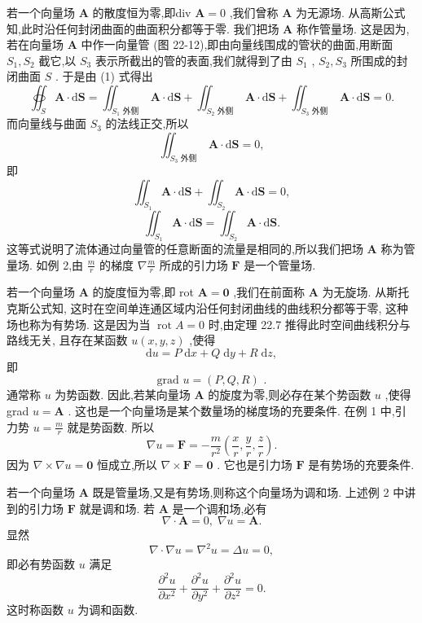 若一个向量场 \(\mathbf{A}\) 的散度恒为零,即div \(\mathbf{A} = 0\) ,我们曾称 \(\mathbf{A}\) 为无源场. 从高斯公式知,此时沿任何封闭曲面的曲面积分都等于零. 我们把场 \(\mathbf{A}\) 称作管量场. 这是因为,若在向量场 \(\mathbf{A}\) 中作一向量管 (图 22-12),即由向量线围成的管状的曲面,用断面 \({S}_{1},{S}_{2}\) 截它,以 \({S}_{3}\) 表示所截出的管的表面,我们就得到了由 \({S}_{1}\) , \({S}_{2},{S}_{3}\) 所围成的封闭曲面 \(S\) . 于是由 (1) 式得出
\[
{\oiint }_{S}\mathbf{A} \cdot  \mathrm{d}\mathbf{S} = {\iint }_{{S}_{1}\text{ 外侧 }}\mathbf{A} \cdot  \mathrm{d}\mathbf{S} + {\iint }_{{S}_{2}\text{ 外侧 }}\mathbf{A} \cdot  \mathrm{d}\mathbf{S} + {\iint }_{{S}_{3}\text{ 外侧 }}\mathbf{A} \cdot  \mathrm{d}\mathbf{S} = 0.
\]
而向量线与曲面 \({S}_{3}\) 的法线正交,所以
\[
{\iint }_{{S}_{3}\text{ 外侧 }}\mathbf{A} \cdot  \mathrm{d}\mathbf{S} = 0,
\]
即
\[
{\iint }_{{S}_{1}}\mathbf{A} \cdot  \mathrm{d}\mathbf{S} + {\iint }_{{S}_{2}}\mathbf{A} \cdot  \mathrm{d}\mathbf{S} = 0,
\]
\[
{\iint }_{{S}_{1}}\mathbf{A} \cdot  \mathrm{d}\mathbf{S} = {\iint }_{{S}_{2}}\mathbf{A} \cdot  \mathrm{d}\mathbf{S}.
\]
这等式说明了流体通过向量管的任意断面的流量是相同的,所以我们把场 \(\mathbf{A}\) 称为管量场. 如例 2,由 \(\frac{m}{r}\) 的梯度 \(\nabla \frac{m}{r}\) 所成的引力场 \(\mathbf{F}\) 是一个管量场.

若一个向量场 \(\mathbf{A}\) 的旋度恒为零,即 rot \(\mathbf{A} = \mathbf{0}\) ,我们在前面称 \(\mathbf{A}\) 为无旋场. 从斯托克斯公式知, 这时在空间单连通区域内沿任何封闭曲线的曲线积分都等于零, 这种场也称为有势场. 这是因为当 \(\operatorname{rot}A = 0\) 时,由定理 22.7 推得此时空间曲线积分与路线无关, 且存在某函数 \(u\left( {x,y,z}\right)\) ,使得
\[
\mathrm{d}u = P\mathrm{\;d}x + Q\mathrm{\;d}y + R\mathrm{\;d}z,
\]
即
\[
\text{ grad }u = \left( {P,Q,R}\right) \text{ . }
\]
通常称 \(u\) 为势函数. 因此,若某向量场 \(\mathbf{A}\) 的旋度为零,则必存在某个势函数 \(u\) ,使得 grad \(u = \mathbf{A}\) . 这也是一个向量场是某个数量场的梯度场的充要条件. 在例 1 中,引力势 \(u = \frac{m}{r}\) 就是势函数. 所以
\[
\nabla u = \mathbf{F} =  - \frac{m}{{r}^{2}}\left( {\frac{x}{r},\frac{y}{r},\frac{z}{r}}\right) .
\]
因为 \(\nabla  \times  \nabla u = \mathbf{0}\) 恒成立,所以 \(\nabla  \times  \mathbf{F} = \mathbf{0}\) . 它也是引力场 \(\mathbf{F}\) 是有势场的充要条件.

若一个向量场 \(\mathbf{A}\) 既是管量场,又是有势场,则称这个向量场为调和场. 上述例 2 中讲到的引力场 \(\mathbf{F}\) 就是调和场. 若 \(\mathbf{A}\) 是一个调和场,必有
\[
\nabla  \cdot  \mathbf{A} = 0,\;\nabla u = \mathbf{A}.
\]
显然
\[
\nabla  \cdot  \nabla u = {\nabla }^{2}u = {\Delta u} = 0,
\]
即必有势函数 \(u\) 满足
\[
\frac{{\partial }^{2}u}{\partial {x}^{2}} + \frac{{\partial }^{2}u}{\partial {y}^{2}} + \frac{{\partial }^{2}u}{\partial {z}^{2}} = 0.
\]
这时称函数 \(u\) 为调和函数.

